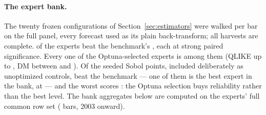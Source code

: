 \paragraph{The expert bank.} The twenty frozen configurations of
Section~\ref{sec:estimators} were walked per bar on the full panel, every
forecast used as its plain back-transform; all
\unifTreeBankNExperts{} harvests are complete. \unifTreeBankNBeat{} of
the experts beat the benchmark's \unifAzeroQLIKE{}, each at strong
paired significance. Every one of the \unifTreeBankNOpt{}
Optuna-selected experts is among them (QLIKE up to
\unifTreeBankWorstOptQLIKE{}, DM between \unifTreeBankOptBestDM{} and
\unifTreeBankOptWorstDM{}). Of the \unifTreeBankNSobol{} seeded Sobol
points, included deliberately as unoptimized controls,
\unifTreeBankNSobolBeat{} beat the benchmark --- one of them is the best
expert in the bank, at \unifTreeBankBestQLIKE{} --- and the worst scores
\unifTreeBankSobolWorstQLIKE{}: the Optuna selection buys reliability
rather than the best level. The bank aggregates below are computed on the
experts' full common row set (\unifTreeHedgeN{} bars, 2003 onward).


